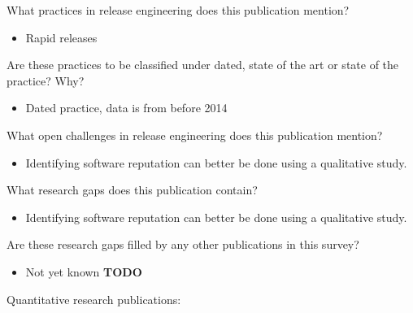 \documentclass[]{book}
\providecommand{\tightlist}{%
  \setlength{\itemsep}{0pt}\setlength{\parskip}{0pt}}
\begin{document}
What practices in release engineering does this publication mention?

\begin{itemize}
\tightlist
\item
  Rapid releases
\end{itemize}

Are these practices to be classified under dated, state of the art or
state of the practice? Why?

\begin{itemize}
\tightlist
\item
  Dated practice, data is from before 2014
\end{itemize}

What open challenges in release engineering does this publication
mention?

\begin{itemize}
\tightlist
\item
  Identifying software reputation can better be done using a qualitative
  study.
\end{itemize}

What research gaps does this publication contain?

\begin{itemize}
\tightlist
\item
  Identifying software reputation can better be done using a qualitative
  study.
\end{itemize}

Are these research gaps filled by any other publications in this survey?

\begin{itemize}
\tightlist
\item
  Not yet known \textbf{TODO}
\end{itemize}

Quantitative research publications:
\end{document}
